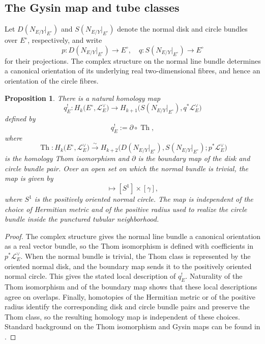 \documentclass[12pt]{amsart}
\numberwithin{equation}{section}
\theoremstyle{plain}
\newtheorem{proposition}[theorem]{Proposition}
\theoremstyle{definition}
\theoremstyle{remark}
\theoremstyle{definition}
\newcommand{\Lcal}{\mathscr L}
\begin{document}
\subsection{The Gysin map and tube classes}

Let $D(N_{E/Y}|_{E^\circ})$ and $S(N_{E/Y}|_{E^\circ})$ denote the normal disk and circle bundles over $E^\circ$, respectively, and write
\begin{equation*}
p:D(N_{E/Y}|_{E^\circ})\to  E^\circ,\quad q:S(N_{E/Y}|_{E^\circ})\to  E^\circ
\end{equation*}
for their projections. The complex structure on the normal line bundle determines a canonical orientation of its underlying real two-dimensional fibres, and hence an orientation of the circle fibres.

\begin{proposition}\label{prop:degree-one-thom-gysin}
    There is a natural homology map
    \begin{equation}\label{eq:gysin-homology-transfer}
    q_E^!:H_k\bigl(E^\circ,\Lcal_E^\vee\bigr)\to H_{k+1}\bigl(S(N_{E/Y}|_{E^\circ}),q^*\Lcal_E^\vee\bigr)
    \end{equation}
    defined by
    \begin{equation*}
    q_E^!:=\partial\circ\operatorname{Th},
    \end{equation*}
    where
    \begin{equation*}
    \operatorname{Th}:H_k\bigl(E^\circ,\Lcal_E^\vee\bigr)\xrightarrow{\sim}H_{k+2}\bigl(D(N_{E/Y}|_{E^\circ}),S(N_{E/Y}|_{E^\circ});p^*\Lcal_E^\vee\bigr)
    \end{equation*}
    is the homology Thom isomorphism and $\partial$ is the boundary map of the disk and circle bundle pair. Over an open set on which the normal bundle is trivial, the map is given by
    \begin{equation*}
    [\gamma]\mapsto[S^1]\times[\gamma],
    \end{equation*}
    where $S^1$ is the positively oriented normal circle. The map is independent of the choice of Hermitian metric and of the positive radius used to realize the circle bundle inside the punctured tubular neighborhood.
\end{proposition}


\begin{proof}
    The complex structure gives the normal line bundle a canonical orientation as a real vector bundle, so the Thom isomorphism is defined with coefficients in $p^*\Lcal_E^\vee$. When the normal bundle is trivial, the Thom class is represented by the oriented normal disk, and the boundary map sends it to the positively oriented normal circle. This gives the stated local description of $q_E^!$. Naturality of the Thom isomorphism and of the boundary map shows that these local descriptions agree on overlaps. Finally, homotopies of the Hermitian metric or of the positive radius identify the corresponding disk and circle bundle pairs and preserve the Thom class, so the resulting homology map is independent of these choices. Standard background on the Thom isomorphism and Gysin maps can be found in \cite[Chapter~VI, Section~11]{Bredon1993}.
\end{proof}
\end{document}
